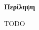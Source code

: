 \begin{center}
    \centering

    \vspace{0.5cm}
    \centering
    \textbf{\Large{Περίληψη}}

    \vspace{1cm}
\end{center}

TODO

